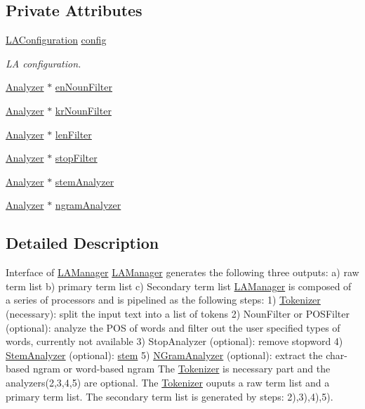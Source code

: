 \subsection*{Private Attributes}
\begin{CompactItemize}
\item 
\hyperlink{classla__manager_1_1LAConfiguration}{LAConfiguration} \hyperlink{classla__manager_1_1LAManager_00460d91a83a5f42c47b989d80a5b86f}{config}
\begin{CompactList}\small\item\em LA configuration. \item\end{CompactList}\item 
\hyperlink{classla__manager_1_1Analyzer}{Analyzer} $\ast$ \hyperlink{classla__manager_1_1LAManager_78caa4de3178a8bcf37e33272e337f46}{enNounFilter}
\item 
\hyperlink{classla__manager_1_1Analyzer}{Analyzer} $\ast$ \hyperlink{classla__manager_1_1LAManager_4ce35eb40c9be46b85c583f0be9c06f0}{krNounFilter}
\item 
\hyperlink{classla__manager_1_1Analyzer}{Analyzer} $\ast$ \hyperlink{classla__manager_1_1LAManager_937ffbd6637ceb994e7446adffbff8d1}{lenFilter}
\item 
\hyperlink{classla__manager_1_1Analyzer}{Analyzer} $\ast$ \hyperlink{classla__manager_1_1LAManager_3bad82627c93c35a8ff18799e7d45f3e}{stopFilter}
\item 
\hyperlink{classla__manager_1_1Analyzer}{Analyzer} $\ast$ \hyperlink{classla__manager_1_1LAManager_7be7239a75586a86593c75ec965c7dec}{stemAnalyzer}
\item 
\hyperlink{classla__manager_1_1Analyzer}{Analyzer} $\ast$ \hyperlink{classla__manager_1_1LAManager_b3cdad6370589405b9d57deeb457e2f8}{ngramAnalyzer}
\end{CompactItemize}


\subsection{Detailed Description}
Interface of \hyperlink{classla__manager_1_1LAManager}{LAManager} \hyperlink{classla__manager_1_1LAManager}{LAManager} generates the following three outputs: a) raw term list b) primary term list c) Secondary term list \hyperlink{classla__manager_1_1LAManager}{LAManager} is composed of a series of processors and is pipelined as the following steps: 1) \hyperlink{classla__manager_1_1Tokenizer}{Tokenizer} (necessary): split the input text into a list of tokens 2) NounFilter or POSFilter (optional): analyze the POS of words and filter out the user specified types of words, currently not available 3) StopAnalyzer (optional): remove stopword 4) \hyperlink{classla__manager_1_1StemAnalyzer}{StemAnalyzer} (optional): \hyperlink{namespacela__manager_1_1stem}{stem} 5) \hyperlink{classla__manager_1_1NGramAnalyzer}{NGramAnalyzer} (optional): extract the char-based ngram or word-based ngram The \hyperlink{classla__manager_1_1Tokenizer}{Tokenizer} is necessary part and the analyzers(2,3,4,5) are optional. The \hyperlink{classla__manager_1_1Tokenizer}{Tokenizer} ouputs a raw term list and a primary term list. The secondary term list is generated by steps: 2),3),4),5). 

